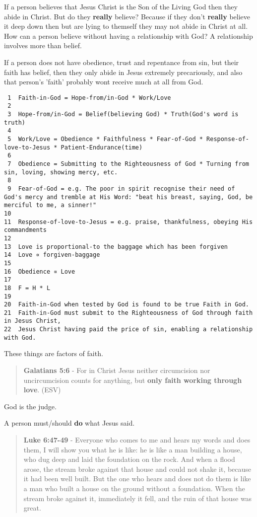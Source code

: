\documentclass[11pt]{article}
\begin{document}
If a person believes that Jesus Christ is the Son of the Living God then they abide in Christ.
But do they \textbf{really} believe? Because if they don't \textbf{really} believe it deep down then but are lying to themself they may not abide in Christ at all.
How can a person believe without having a relationship with God? A relationship involves more than belief.

If a person does not have obedience, trust and
repentance from sin, but their faith has belief, then they only
abide in Jesus extremely precariously, and also that person's 'faith' probably wont receive much at all from God.

\begin{verbatim}
 1  Faith-in-God = Hope-from/in-God * Work/Love
 2  
 3  Hope-from/in-God = Belief(believing God) * Truth(God's word is truth)
 4  
 5  Work/Love = Obedience * Faithfulness * Fear-of-God * Response-of-love-to-Jesus * Patient-Endurance(time)
 6  
 7  Obedience = Submitting to the Righteousness of God * Turning from sin, loving, showing mercy, etc.
 8  
 9  Fear-of-God = e.g. The poor in spirit recognise their need of God's mercy and tremble at His Word: "beat his breast, saying, God, be merciful to me, a sinner!"
10  
11  Response-of-love-to-Jesus = e.g. praise, thankfulness, obeying His commandments
12  
13  Love is proportional-to the baggage which has been forgiven
14  Love ∝ forgiven-baggage
15  
16  Obedience ∝ Love
17  
18  F = H * L
19  
20  Faith-in-God when tested by God is found to be true Faith in God.
21  Faith-in-God must submit to the Righteousness of God through faith in Jesus Christ,
22  Jesus Christ having paid the price of sin, enabling a relationship with God.
\end{verbatim}

These things are factors of faith.

\begin{quote}
\textbf{Galatians 5:6} - For in Christ Jesus neither circumcision nor uncircumcision counts for anything, but \textbf{only faith working through love}. (ESV)
\end{quote}

God is the judge.

A person must/should \textbf{do} what Jesus said.

\begin{quote}
\textbf{Luke 6:47-49} - Everyone who comes to me and hears my words and does them, I will show you what he is like: he is like a man building a house, who dug deep and laid the foundation on the rock. And when a flood arose, the stream broke against that house and could not shake it, because it had been well built.  But the one who hears and does not do them is like a man who built a house on the ground without a foundation. When the stream broke against it, immediately it fell, and the ruin of that house was great.
\end{quote}
\end{document}

